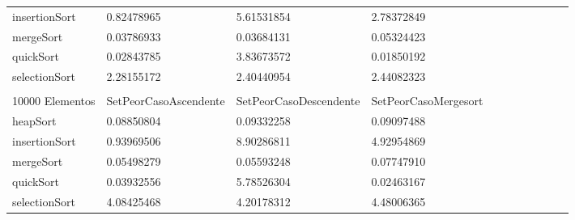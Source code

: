 \documentclass[article,a4paper]{article}
\begin{document}
\begin{table}[h]
\begin{adjustbox}{width=\textwidth,totalheight=\textheight,keepaspectratio}
\begin{tabular}{lllllllllll}
insertionSort   & 0.82478965            & 5.61531854             & 2.78372849           \\
mergeSort       & 0.03786933            & 0.03684131             & 0.05324423           \\
quickSort       & 0.02843785            & 3.83673572             & 0.01850192           \\
selectionSort   & 2.28155172            & 2.40440954             & 2.44082323           \\
                &                       &                        &                      \\
10000 Elementos & SetPeorCasoAscendente & SetPeorCasoDescendente & SetPeorCasoMergesort \\
heapSort        & 0.08850804            & 0.09332258             & 0.09097488           \\
insertionSort   & 0.93969506            & 8.90286811             & 4.92954869           \\
mergeSort       & 0.05498279            & 0.05593248             & 0.07747910           \\
quickSort       & 0.03932556            & 5.78526304             & 0.02463167           \\
selectionSort   & 4.08425468            & 4.20178312             & 4.48006365           
\end{tabular}
\end{adjustbox}
\end{table}
\end{document}
